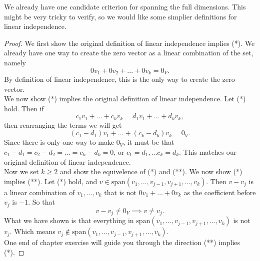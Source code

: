 We already have one candidate criterion for spanning the full dimensions.
This might be very tricky to verify, so we would like some simplier definitions for linear independence.
\begin{proof}%
	We first show the original definition of linear independence implies (*).
	We already have one way to create the zero vector as a linear combination of the set, namely\[
	0v_1+0v_2+...+0v_k=0_V.
	\] By definition of linear independence, this is the only way to create the zero vector.
	\\
	We now show (*) implies the original definition of linear independence. Let (*) hold. Then if \[
	c_1v_1+...+c_kv_k=d_1v_1+...+d_kv_k,
	\] then rearranging the terms we will get \[
		(c_1-d_1)v_1+...+(c_k-d_k)v_k = 0_V.
	\]
	Since there is only one way to make $0_V$, it must be that $c_1-d_1=c_2-d_2=...=c_k-d_k=0$, or $c_1=d_1,...c_k=d_k$. This matches our original definition of linear independence.
\\
	Now we set $k\geq 2$ and show the equivelence of (*) and (**).
	We now show (*) implies (**).  
	Let (*) hold, and $v\in\textrm{span}(v_1,...,v_{j-1},v_{j+1},...,v_{k})$.
	Then $v-v_j$ is a linear combination of $v_1,...,v_k$ that is not $0v_1+...+0v_k$ as the coefficient before $v_j$ is $-1$. So that \[
		v-v_j\neq 0_V \implies v\neq v_j.
	\]
	What we have shown is that everything in $\textrm{span}(v_1,...,v_{j-1},v_{j+1},...,v_{k})$ is not $v_j$. Which means $v_j\notin \textrm{span}(v_1,...,v_{j-1},v_{j+1},...,v_k)$.
	\\
	One end of chapter exercise will guide you through the direction (**) implies (*).
\end{proof}

